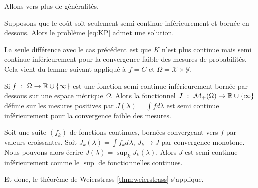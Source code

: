 \documentclass[a4paper,12pt]{article}
\begin{document}
Allons vers plus de généralités. 

\begin{proposition}
Supposons que le coût soit seulement semi continue inférieurement et bornée en dessous. Alors le problème \eqref{eq:KP} admet une solution. 
\end{proposition}
\begin{preuve}
La seule différence avec le cas précédent est que $K$ n'est plus continue mais semi continue inférieurement pour la convergence faible des mesures de probabilités. Cela vient du lemme suivant appliqué à $f = C$ et $\Omega = \mathcal{X}\times\mathcal{Y}$.
\begin{lemme}
Si $f\ :\ \Omega\rightarrow \mathbb{R}\cup\{\infty\}$ est une fonction semi-continue inférieurement bornée par dessous sur une espace métrique $\Omega$. Alors la fonctionnel $J \ :\ \mathcal{M}_+(\Omega )\rightarrow \RR\cup\{\infty\}$ définie sur les mesures positives par $J(\lambda) =\int f d\lambda$ est semi continue inférieurement pour la convergence faible des mesures. 
\end{lemme}
\begin{preuve}
Soit une suite $(f_k)$ de fonctions continues, bornées convergeant vers $f$ par valeurs croissantes. 
Soit $J_k(\lambda ) =\int f_k d\lambda$, $J_k\rightarrow J$ par convergence monotone. Nous pouvons alors écrire $J(\lambda )=\sup_k J_k(\lambda )$.
Alors $J$ est semi-continue inférieurement comme le $\sup$ de fonctionnelles continues.
\end{preuve}
Et donc, le théorème de Weierstrass \eqref{thm:weierstrass} s'applique.
\end{preuve}
\end{document}
